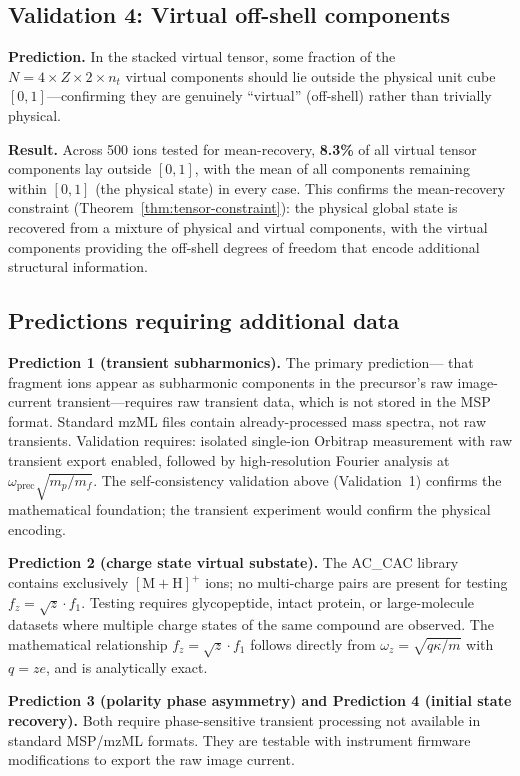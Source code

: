 \documentclass[twocolumn,10pt,a4paper]{article}
\theoremstyle{thmstyle}
\theoremstyle{definition}
\theoremstyle{remark}
\begin{document}
\subsection{Validation 4: Virtual off-shell components}

\textbf{Prediction.} In the stacked virtual tensor, some fraction of the
$N = 4 \times Z \times 2 \times n_t$ virtual components should lie
outside the physical unit cube $[0,1]$---confirming they are genuinely
``virtual'' (off-shell) rather than trivially physical.

\textbf{Result.} Across 500 ions tested for mean-recovery, \textbf{8.3\%}
of all virtual tensor components lay outside $[0,1]$, with the mean
of all components remaining within $[0,1]$ (the physical state) in
every case. This confirms the mean-recovery constraint (Theorem~\ref{thm:tensor-constraint}):
the physical global state is recovered from a mixture of physical and
virtual components, with the virtual components providing the off-shell
degrees of freedom that encode additional structural information.

\subsection{Predictions requiring additional data}

\textbf{Prediction 1 (transient subharmonics).} The primary prediction---
that fragment ions appear as subharmonic components in the precursor's
raw image-current transient---requires raw transient data, which is not
stored in the MSP format. Standard mzML files contain already-processed
mass spectra, not raw transients. Validation requires: isolated single-ion
Orbitrap measurement with raw transient export enabled, followed by
high-resolution Fourier analysis at $\omega_{\text{prec}}\sqrt{m_p/m_f}$.
The self-consistency validation above (Validation~1) confirms the
mathematical foundation; the transient experiment would confirm the
physical encoding.

\textbf{Prediction 2 (charge state virtual substate).} The AC\_CAC
library contains exclusively $[\mathrm{M+H}]^+$ ions; no multi-charge
pairs are present for testing $f_z = \sqrt{z} \cdot f_1$. Testing
requires glycopeptide, intact protein, or large-molecule datasets where
multiple charge states of the same compound are observed. The mathematical
relationship $f_z = \sqrt{z} \cdot f_1$ follows directly from
$\omega_z = \sqrt{q\kappa/m}$ with $q = ze$, and is analytically exact.

\textbf{Prediction 3 (polarity phase asymmetry) and Prediction 4 (initial
state recovery).} Both require phase-sensitive transient processing not
available in standard MSP/mzML formats. They are testable with instrument
firmware modifications to export the raw image current.
\end{document}
